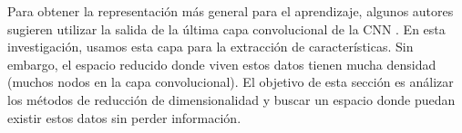 Para obtener la representación más general para el aprendizaje, algunos autores sugieren utilizar la salida de la última capa convolucional de la CNN \cite{DBLP:journals/corr/SablayrollesDJU16}. En esta investigación, usamos esta capa  para la extracción de características. Sin embargo, el espacio reducido donde viven estos datos tienen mucha densidad (muchos nodos en la capa convolucional). El objetivo de esta sección es análizar los métodos de reducción de dimensionalidad y buscar un espacio  donde puedan existir estos datos sin perder información.
\begin{figure}[htbp]
\centering
{}

\end{figure}
